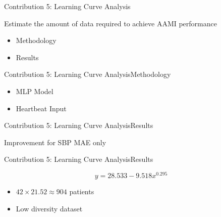 \begin{frame}{Contribution 5: Learning Curve Analysis}
    \begin{block}{Estimate the amount of data required to achieve AAMI performance}
        \begin{itemize}
            \item Methodology
            \item Results
        \end{itemize}
    \end{block}
\end{frame}

\begin{frame}{Contribution 5: Learning Curve Analysis}{Methodology}
    \begin{figure}
        
    \end{figure}
    \begin{itemize}
        \item MLP Model
        \item Heartbeat Input
    \end{itemize}
\end{frame}

\begin{frame}{Contribution 5: Learning Curve Analysis}{Results}
    \begin{figure}[htbp]
        
        \hfill
        

        
        \hfill
        
    \end{figure}
    Improvement for SBP MAE only
\end{frame}


\begin{frame}{Contribution 5: Learning Curve Analysis}{Results}

    \begin{equation}\label{eq:fitted curve}
        y=\num{28.533} - \num{9.518} x^{\num{0.295}}
    \end{equation}
    \begin{figure}[htbp]
        
    \end{figure}

    \pause
    \begin{itemize}
        \item $42 \times 21.52 \approx 904$ patients
        \item Low diversity dataset
    \end{itemize}
\end{frame}



